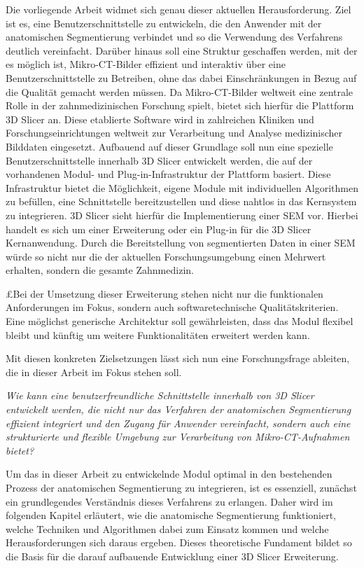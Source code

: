 Die vorliegende Arbeit widmet sich genau dieser aktuellen Herausforderung. Ziel
ist es, eine Benutzerschnittstelle zu entwickeln, die den Anwender mit der
anatomischen Segmentierung verbindet und so die Verwendung des Verfahrens
deutlich vereinfacht. Darüber hinaus soll eine Struktur geschaffen werden, mit
der es möglich ist, Mikro-\ac{CT}-Bilder effizient und interaktiv über eine Benutzerschnittstelle
zu Betreiben, ohne das dabei Einschränkungen in Bezug auf die Qualität gemacht
werden müssen. Da Mikro-\ac{CT}-Bilder weltweit eine zentrale Rolle in der
zahnmedizinischen Forschung spielt, bietet sich hierfür die Plattform 3D Slicer an.
Diese etablierte Software wird in zahlreichen Kliniken und
Forschungseinrichtungen weltweit zur Verarbeitung und Analyse medizinischer
Bilddaten eingesetzt. Aufbauend auf dieser Grundlage soll nun eine spezielle Benutzerschnittstelle
innerhalb 3D Slicer entwickelt werden, die auf der vorhandenen Modul- und Plug-in-Infrastruktur
der Plattform basiert. Diese Infrastruktur bietet die Möglichkeit, eigene Module
mit individuellen Algorithmen zu befüllen, eine Schnittstelle bereitzustellen
und diese nahtlos in das Kernsystem zu integrieren. 3D Slicer sieht hierfür die Implementierung
einer \ac{SEM} vor. Hierbei handelt es sich um einer Erweiterung oder ein Plug-in
für die 3D Slicer Kernanwendung. Durch die Bereitstellung von segmentierten
Daten in einer \ac{SEM} würde so nicht nur die der aktuellen Forschungsumgebung einen
Mehrwert erhalten, sondern die gesamte Zahnmedizin.

£Bei der Umsetzung dieser Erweiterung stehen nicht nur die funktionalen
Anforderungen im Fokus, sondern auch softwaretechnische Qualitätskriterien. Eine
möglichst generische Architektur soll gewährleisten, dass das Modul flexibel bleibt
und künftig um weitere Funktionalitäten erweitert werden kann.

Mit diesen konkreten Zielsetzungen lässt sich nun eine Forschungsfrage ableiten,
die in dieser Arbeit im Fokus stehen soll.

\begin{center}
	\textit{Wie kann eine benutzerfreundliche Schnittstelle innerhalb von 3D
	Slicer entwickelt werden, die nicht nur das Verfahren der anatomischen Segmentierung
	effizient integriert und den Zugang für Anwender vereinfacht, sondern auch
	eine strukturierte und flexible Umgebung zur Verarbeitung von Mikro-\ac{CT}-Aufnahmen
	bietet?}
\end{center}

Um das in dieser Arbeit zu entwickelnde Modul optimal in den bestehenden Prozess
der anatomischen Segmentierung zu integrieren, ist es essenziell, zunächst ein grundlegendes
Verständnis dieses Verfahrens zu erlangen. Daher wird im folgenden Kapitel
erläutert, wie die anatomische Segmentierung funktioniert, welche Techniken und
Algorithmen dabei zum Einsatz kommen und welche Herausforderungen sich daraus
ergeben. Dieses theoretische Fundament bildet so die Basis für die darauf aufbauende
Entwicklung einer 3D Slicer Erweiterung.
